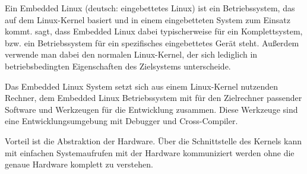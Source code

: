 Ein Embedded Linux (deutsch: eingebettetes Linux) ist ein Betriebssystem, das auf dem Linux-Kernel basiert und in einem eingebetteten System zum Einsatz kommt. \cite{yaghmour2008building} sagt, dass Embedded Linux dabei typischerweise für ein Komplettsystem, bzw. ein Betriebssystem für ein spezifisches eingebettetes Gerät steht. Außerdem verwende man dabei den normalen Linux-Kernel, der sich lediglich in betriebsbedingten Eigenschaften des Zielsystems unterscheide.\ 

Das Embedded Linux System setzt sich aus einem Linux-Kernel nutzenden Rechner, dem Embedded Linux Betriebssystem mit für den Zielrechner passender Software und Werkzeugen für die Entwicklung zusammen. Diese Werkzeuge sind eine Entwicklungsumgebung mit Debugger und Cross-Compiler.

Vorteil ist die Abstraktion der Hardware. Über die Schnittstelle des Kernels kann mit einfachen Systemaufrufen mit der Hardware kommuniziert werden ohne die genaue Hardware komplett zu verstehen.
